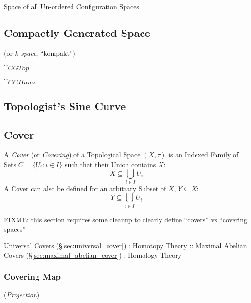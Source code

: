Space of all Un-ordered Configuration Spaces



\subsection{Compactly Generated Space}\label{sec:compactly_generated}

(or \emph{$k$-space}, ``kompakt'')

$\cat{CGTop}$

$\cat{CGHaus}$



\subsection{Topologist's Sine Curve}\label{sec:topologists_sine}

\subsection{Cover}\label{sec:topological_cover}

A \emph{Cover} (or \emph{Covering}) of a Topological Space $(X, \tau)$
is an Indexed Family of Sets $C = \{ U_i : i \in I \}$ such that their
Union contains $X$:
\[
  X \subseteq \bigcup_{i \in I} U_i
\]
A Cover can also be defined for an arbitrary Subset of $X$, $Y
\subseteq X$:
\[
  Y \subseteq \bigcup_{i \in I} U_i
\]

FIXME: this section requires some cleanup to clearly define ``covers''
vs ``covering spaces''

Universal Covers (\S\ref{sec:universal_cover}) : Homotopy Theory ::
Maximal Abelian Covers (\S\ref{sec:maximal_abelian_cover}) : Homology
Theory



\subsubsection{Covering Map}\label{sec:covering_map}

(\emph{Projection})

